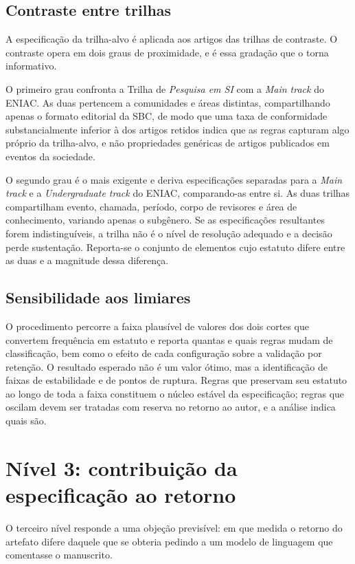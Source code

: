 \subsection*{Contraste entre trilhas}

A especificação da trilha-alvo é aplicada aos artigos das trilhas de contraste. O contraste opera em dois graus de proximidade, e é essa gradação que o torna informativo.

O primeiro grau confronta a Trilha de \textit{Pesquisa em SI} com a \textit{Main track} do ENIAC. As duas pertencem a comunidades e áreas distintas, compartilhando apenas o formato editorial da SBC, de modo que uma taxa de conformidade substancialmente inferior à dos artigos retidos indica que as regras capturam algo próprio da trilha-alvo, e não propriedades genéricas de artigos publicados em eventos da sociedade.

O segundo grau é o mais exigente e deriva especificações separadas para a \textit{Main track} e a \textit{Undergraduate track} do ENIAC, comparando-as entre si. As duas trilhas compartilham evento, chamada, período, corpo de revisores e área de conhecimento, variando apenas o subgênero. Se as especificações resultantes forem indistinguíveis, a trilha não é o nível de resolução adequado e a decisão perde sustentação. Reporta-se o conjunto de elementos cujo estatuto difere entre as duas e a magnitude dessa diferença.

\subsection*{Sensibilidade aos limiares}

O procedimento percorre a faixa plausível de valores dos dois cortes que convertem frequência em estatuto e reporta quantas e quais regras mudam de classificação, bem como o efeito de cada configuração sobre a validação por retenção. O resultado esperado não é um valor ótimo, mas a identificação de faixas de estabilidade e de pontos de ruptura. Regras que preservam seu estatuto ao longo de toda a faixa constituem o núcleo estável da especificação; regras que oscilam devem ser tratadas com reserva no retorno ao autor, e a análise indica quais são.


\section{Nível 3: contribuição da especificação ao retorno}
\label{sec:nivel3}

O terceiro nível responde a uma objeção previsível: em que medida o retorno do artefato difere daquele que se obteria pedindo a um modelo de linguagem que comentasse o manuscrito.

